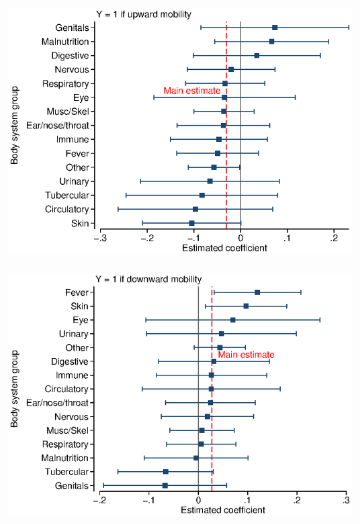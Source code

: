 \documentclass[12pt,english]{article}
\begin{document}
\begin{figure}[!ht]
\caption[Effects of hospitalization by body system classification]{Effects of hospitalization by body system classification}
\centering
\begin{subfigure}{0.49\textwidth}
	\centering
	\includegraphics[width=1.00\linewidth]{../output/02_appendix/figure_a11_panel_1.eps}
\end{subfigure}
\begin{subfigure}{0.49\textwidth}
	\centering
	\includegraphics[width=1.00\linewidth]{../output/02_appendix/figure_a11_panel_2.eps}
\end{subfigure}
\begin{subfigure}{0.49\textwidth}
	\centering

\end{subfigure}
\end{figure}
\end{document}
